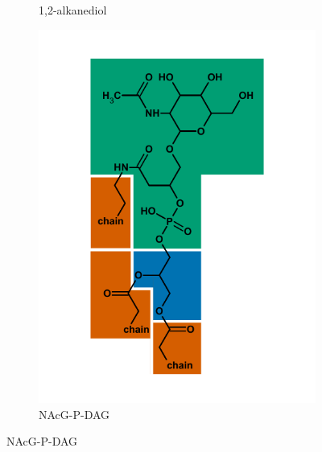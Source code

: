 {\begin{figure}[h]
\begin{subfigure}[b]{.45\linewidth}
    	\caption{1,2-alkanediol}
        \label{fig:diol}
    \end{subfigure}
    \begin{subfigure}[b]{.45\linewidth}
    	\includegraphics[width=\linewidth]{figs_ch1/NAcG-P-DAG}
    	\caption{NAcG-P-DAG}
        \label{fig:NAcG-P-DAG}
    \end{subfigure}
    \end{figure}
\newpage
\begin{figure}[h]\ContinuedFloat
    \begin{subfigure}[b]{.45\linewidth}

\end{subfigure}
\end{figure}}
